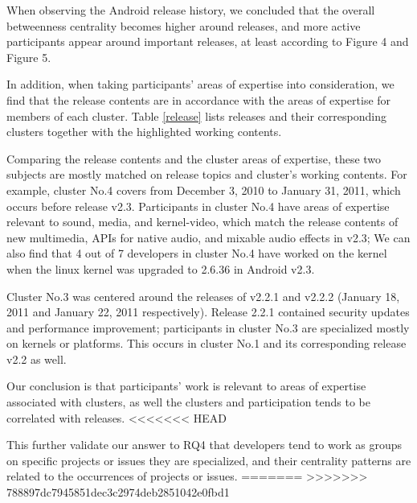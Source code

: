 \documentclass[conference]{IEEEtran}
\begin{document}
When observing the Android release history, we concluded
that the overall betweenness centrality becomes higher around
releases, and more active participants appear around important
releases, at least according to Figure 4 and Figure 5.


In addition, when taking participants' areas of expertise into consideration,
we find that the release contents are in accordance with the
areas of expertise for members of each cluster. Table \ref{release} lists
releases and their corresponding clusters together with the
highlighted working contents.


Comparing the release contents and the cluster areas of expertise, these two
subjects are mostly matched on release topics and cluster's working
contents. For example, cluster No.4 covers from December 3, 2010 to
January 31, 2011, which occurs before release v2.3. Participants in
cluster No.4 have areas of expertise relevant to sound, media, and kernel-video, which
match the release contents of new multimedia, APIs for native audio,
and mixable audio effects in v2.3; 
We can also find that 4 out of 7
developers in cluster No.4 have worked on the kernel when 
the linux kernel was upgraded to 2.6.36 in Android v2.3.

Cluster No.3 was centered around the releases of v2.2.1 and v2.2.2
(January 18, 2011 and January 22, 2011 respectively). Release 2.2.1
contained security updates and performance improvement; participants
in cluster No.3 are specialized mostly on kernels or platforms.  
This occurs in cluster
No.1 and its corresponding release v2.2 as well.


Our conclusion is that participants' work is relevant to areas of expertise
associated with clusters, as well the clusters and participation tends
to be correlated with releases.
<<<<<<< HEAD

This further validate our answer to RQ4 that developers tend to work as groups on specific projects or issues they are specialized, and their centrality patterns are related to the occurrences of projects or issues.
=======
>>>>>>> 788897dc7945851dec3c2974deb2851042e0fbd1
\end{document}
